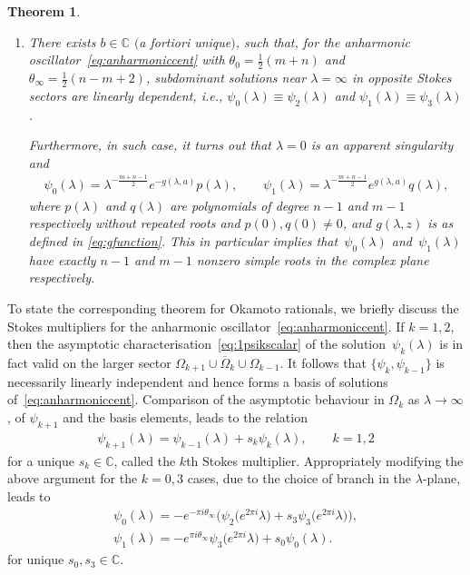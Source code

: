 \documentclass[pdftex]{sigma}
\numberwithin{equation}{section}
\newtheorem{thm}{Theorem}[section]
\newcommand{\la}{\lambda}
\begin{document}
\begin{thm}
\begin{enumerate}[label={{\rm H.\arabic*:}},ref={\rm H.\arabic*}]
\item There exists $b\in\mathbb{C}$ $($a fortiori unique$)$, such that, for the anharmonic oscillator~\eqref{eq:anharmoniccent} with
		$\theta_0=\tfrac{1}{2}(m+n)$ and $\theta_\infty=\tfrac{1}{2}(n-m+2)$, subdominant solutions near $\lambda=\infty$ in
		opposite Stokes sectors are linearly dependent, i.e., $\psi_0(\lambda)\equiv \psi_2(\lambda)$ and $\psi_1(\lambda)\equiv \psi_3(\lambda)$.
		
		Furthermore, in such case, it turns out that $\lambda=0$ is an apparent singularity and
			\begin{gather*}
			\psi_0(\lambda)=\lambda^{-\frac{m+n-1}{2}}e^{-g(\lambda,a)}p(\lambda),\qquad \psi_1(\lambda)=\lambda^{-\frac{m+n-1}{2}}e^{g(\lambda,a)}q(\lambda),
			\end{gather*}
		where $p(\lambda)$ and $q(\lambda)$ are polynomials of degree $n-1$ and $m-1$ respectively without repeated roots and $p(0),q(0)\neq0$,
		and $g(\la,z)$ is as def\/ined in \eqref{eq:gfunction}. This in particular implies that~$\psi_0(\lambda)$ and~$\psi_1(\lambda)$ have exactly $n-1$ and $m-1$ nonzero simple roots in the complex plane respectively.	\label{H3}
	\end{enumerate}
	\end{thm}
	
To state the corresponding theorem for Okamoto rationals, we brief\/ly discuss the Stokes multipliers for the anharmonic oscillator~\eqref{eq:anharmoniccent}.
If $k=1,2$, then the asymptotic characterisa\-tion~\eqref{eq:1psikscalar} of the solution~$\psi_k(\la)$ is in fact valid on the larger sector
$\Omega_{k+1}\cup\overline{\Omega}_{k}\cup \Omega_{k-1}$. It follows that $\{\psi_k,\psi_{k-1}\}$ is necessarily linearly independent and hence forms a basis of solutions of~\eqref{eq:anharmoniccent}. Comparison of the asymptotic behaviour in $\Omega_k$ as $\lambda \rightarrow \infty$, of $\psi_{k+1}$ and the basis elements, leads to the relation
\begin{gather}\label{eq:stmult12}
\psi_{k+1}(\lambda)=\psi_{k-1}(\lambda)+s_k\psi_{k}(\lambda), \qquad k=1,2
\end{gather}
for a unique $s_k\in\mathbb{C}$, called the $k$th Stokes multiplier. Appropriately modifying the above argument for the $k=0,3$ cases, due to the choice of branch in the $\lambda$-plane, leads to
\begin{subequations}\label{eq:stmult03}
	\begin{gather}
	\psi_{0}(\lambda)=-e^{-\pi i \theta_\infty}\big(\psi_{2}\big(e^{2\pi i}\lambda\big)+s_3\psi_{3}\big(e^{2\pi i}\lambda\big)\big),\\
	\psi_{1}(\lambda)=-e^{\pi i \theta_\infty}\psi_{3}\big(e^{2\pi i}\lambda\big)+s_0\psi_{0}(\lambda).
	\end{gather}
\end{subequations}
for unique $s_0,s_3\in\mathbb{C}$.
\end{document}
